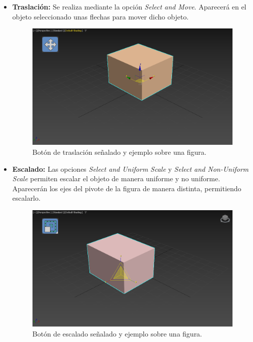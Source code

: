 \documentclass{article}
\begin{document}
\begin{itemize}
    \item \textbf{Traslación: }Se realiza mediante la opción \textit{Select and Move}. Aparecerá en el objeto seleccionado unas flechas para mover dicho objeto.
    
    \begin{figure}[H]
        \centering
        \includegraphics[width=\textwidth]{imagenes/trans.png}
        \caption{Botón de traslación señalado y ejemplo sobre una figura.}
     \end{figure}

    \item \textbf{Escalado: }Las opciones \textit{Select and Uniform Scale} y \textit{Select and Non-Uniform Scale} permiten escalar el objeto de manera uniforme y no uniforme. Aparecerán los ejes del pivote de la figura de manera distinta, permitiendo escalarlo.
    
    \begin{figure}[H]
        \centering
        \includegraphics[width=\textwidth]{imagenes/scale.png}
        \caption{Botón de escalado señalado y ejemplo sobre una figura.}
     \end{figure}



\end{itemize}
\end{document}
